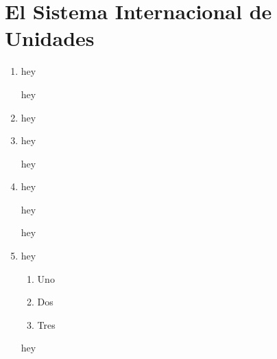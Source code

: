 \hypertarget{el-sistema-internacional-de-unidades}{%
\section{El Sistema Internacional de
Unidades}\label{el-sistema-internacional-de-unidades}}

\begin{enumerate}
\def\labelenumi{\arabic{enumi}.}
\item
  hey

  hey
\item
  hey
\item
  hey

  hey
\item
  hey

  hey

  hey
\item
  hey

  \begin{enumerate}
  \def\labelenumii{\alph{enumii})}
  \tightlist
  \item
    Uno
  \item
    Dos
  \item
    Tres
  \end{enumerate}

  hey
\end{enumerate}
